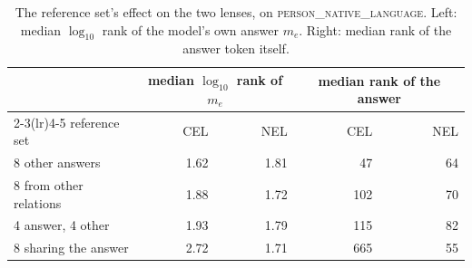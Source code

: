 \begin{table}[t]
\centering
\caption{The reference set's effect on the two lenses, on \textsc{person\_native\_language}. Left: median $\log_{10}$ rank of the model's own answer $m_e$. Right: median rank of the answer token itself.}
\label{tab:refsets}
\begin{tabular}{@{}lrrrr@{}}
\toprule
& \multicolumn{2}{c}{median $\log_{10}$ rank of $m_e$} & \multicolumn{2}{c}{median rank of the answer} \\
\cmidrule(lr){2-3}\cmidrule(lr){4-5}
reference set & CEL & NEL & CEL & NEL \\
\midrule
8 other answers & 1.62 & 1.81 & 47 & 64 \\
8 from other relations & 1.88 & 1.72 & 102 & 70 \\
4 answer, 4 other & 1.93 & 1.79 & 115 & 82 \\
8 sharing the answer & 2.72 & 1.71 & 665 & 55 \\
\bottomrule
\end{tabular}
\end{table}
